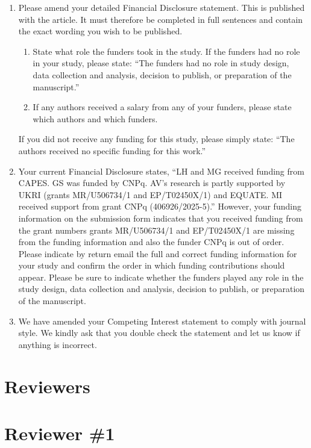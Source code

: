 \documentclass[a4paper, 11pt]{article}
\begin{document}
\begin{enumerate}
    \item Please amend your detailed Financial Disclosure statement. This is published with the article. It must therefore be completed in full sentences and contain the exact wording you wish to be published.
    \begin{enumerate}
        \item[i)] State what role the funders took in the study. If the funders had no role in your study, please state: ``The funders had no role in study design, data collection and analysis, decision to publish, or preparation of the manuscript.''
        \item[ii)] If any authors received a salary from any of your funders, please state which authors and which funders.
    \end{enumerate}
    If you did not receive any funding for this study, please simply state: ``The authors received no specific funding for this work.''
    
    \item Your current Financial Disclosure states, ``LH and MG received funding from CAPES. GS was funded by CNPq. AV's research is partly supported by UKRI (grants MR/U506734/1 and EP/T02450X/1) and EQUATE. MI received support from grant CNPq (406926/2025-5).''
    However, your funding information on the submission form indicates that you received funding from the grant numbers grants MR/U506734/1 and EP/T02450X/1 are missing from the funding information and also the funder CNPq is out of order. Please indicate by return email the full and correct funding information for your study and confirm the order in which funding contributions should appear. Please be sure to indicate whether the funders played any role in the study design, data collection and analysis, decision to publish, or preparation of the manuscript.
    
    \item We have amended your Competing Interest statement to comply with journal style. We kindly ask that you double check the statement and let us know if anything is incorrect.
\end{enumerate}

\section{Reviewers}

\section*{Reviewer \#1}
\end{document}
